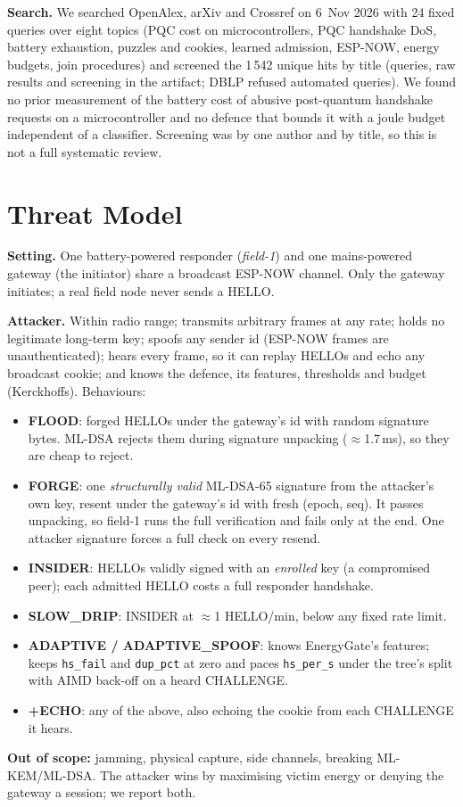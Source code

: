 \documentclass[conference]{IEEEtran}
\begin{document}
\textbf{Search.} We searched OpenAlex, arXiv and Crossref on 6~Nov 2026 with 24 fixed queries over eight topics
(PQC cost on microcontrollers, PQC handshake DoS, battery exhaustion, puzzles and cookies, learned admission, ESP-NOW,
energy budgets, join procedures) and screened the 1\,542 unique hits by title (queries, raw results and screening in
the artifact; DBLP refused automated queries). We found no prior measurement of the battery cost of abusive
post-quantum handshake requests on a microcontroller and no defence that bounds it with a joule budget independent
of a classifier. Screening was by one author and by title, so this is not a full systematic review.

\section{Threat Model}
\textbf{Setting.} One battery-powered responder (\emph{field-1}) and one mains-powered gateway (the initiator) share
a broadcast ESP-NOW channel. Only the gateway initiates; a real field node never sends a HELLO.

\textbf{Attacker.} Within radio range; transmits arbitrary frames at any rate; holds no legitimate long-term key;
spoofs any sender id (ESP-NOW frames are unauthenticated); hears every frame, so it can replay HELLOs and echo any
broadcast cookie; and knows the defence, its features, thresholds and budget (Kerckhoffs). Behaviours:
\begin{itemize}
\item \textbf{FLOOD}: forged HELLOs under the gateway's id with random signature bytes. ML-DSA rejects them during
signature unpacking ($\approx$1.7\,ms), so they are cheap to reject.
\item \textbf{FORGE}: one \emph{structurally valid} ML-DSA-65 signature from the attacker's own key, resent under
the gateway's id with fresh (epoch, seq). It passes unpacking, so field-1 runs the full verification and fails only
at the end. One attacker signature forces a full check on every resend.
\item \textbf{INSIDER}: HELLOs validly signed with an \emph{enrolled} key (a compromised peer); each admitted HELLO
costs a full responder handshake.
\item \textbf{SLOW\_DRIP}: INSIDER at $\approx$1 HELLO/min, below any fixed rate limit.
\item \textbf{ADAPTIVE / ADAPTIVE\_SPOOF}: knows EnergyGate's features; keeps \texttt{hs\_fail} and \texttt{dup\_pct}
at zero and paces \texttt{hs\_per\_s} under the tree's split with AIMD back-off on a heard CHALLENGE.
\item \textbf{+ECHO}: any of the above, also echoing the cookie from each CHALLENGE it hears.
\end{itemize}
\textbf{Out of scope:} jamming, physical capture, side channels, breaking ML-KEM/ML-DSA. The attacker wins by
maximising victim energy or denying the gateway a session; we report both.
\end{document}
